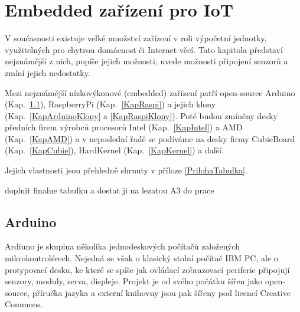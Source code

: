 \chapter{Embedded zařízení pro IoT}

V současnosti existuje velké množství zařízení v roli výpočetní jednotky, využitelných pro chytrou domácnost či Internet věcí. Tato kapitola představí nejznámější z nich, popíše jejich možnosti, uvede možnosti připojení senzorů a zmíní jejich nedostatky. 

Mezi nejznámější nízkovýkonové (embedded) zařízení patří open-source Arduino (Kap.~\ref{KapArduino}), RaspberryPi (Kap.~\ref{KapRaspi}) a jejich klony (Kap.~\ref{KapArduinoKlony} a \ref{KapRaspiKlony}). Poté budou zmíněny desky předních firem výrobců procesorů Intel (Kap.~\ref{KapIntel}) a AMD (Kap.~\ref{KapAMD}) a v neposlední řadě se podíváme na desky firmy CubieBoard (Kap.~\ref{KapCubie}), HardKernel (Kap.~\ref{KapKernel}) a další. 

Jejich vlastnosti jsou přehledně shrnuty v příloze \ref{PrilohaTabulka}.

\colorbox[rgb]{1,0,0}{doplnit finalne tabulku a dostat ji na lezatou A3 do prace}



\section{Arduino}
\label{KapArduino}

	Ardiuno je skupina několika jednodeskových počítačů založených mikrokontrolérech. Nejedná se však o klasický stolní počítač IBM PC, ale o protypovací desku, ke které se spíše jak ovládací  zobrazovací periferie připojují senzory, moduly, serva, displeje. Projekt je od svého počátku šířen jako open-source, příručka jazyka a externí knihovny jsou pak šířeny pod licencí Creative Commons.
	
